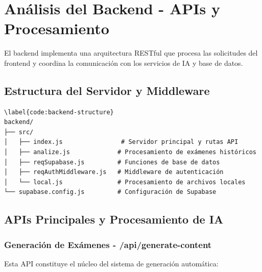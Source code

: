 \documentclass[12pt,a4paper]{report}
\begin{document}
\section{Análisis del Backend - APIs y Procesamiento}

El backend implementa una arquitectura RESTful que procesa las solicitudes del frontend y coordina la comunicación con los servicios de IA y base de datos.

\subsection{Estructura del Servidor y Middleware}

\begin{lstlisting}[language=text, caption={Código \ref{code:backend-structure}: Organización del servidor backend}]
\label{code:backend-structure}
backend/
├── src/
│   ├── index.js                # Servidor principal y rutas API
│   ├── analize.js             # Procesamiento de exámenes históricos
│   ├── reqSupabase.js         # Funciones de base de datos
│   ├── reqAuthMiddleware.js   # Middleware de autenticación
│   └── local.js               # Procesamiento de archivos locales
└── supabase.config.js         # Configuración de Supabase
\end{lstlisting}

\subsection{APIs Principales y Procesamiento de IA}

\subsubsection{Generación de Exámenes - /api/generate-content}

Esta API constituye el núcleo del sistema de generación automática:
\end{document}
